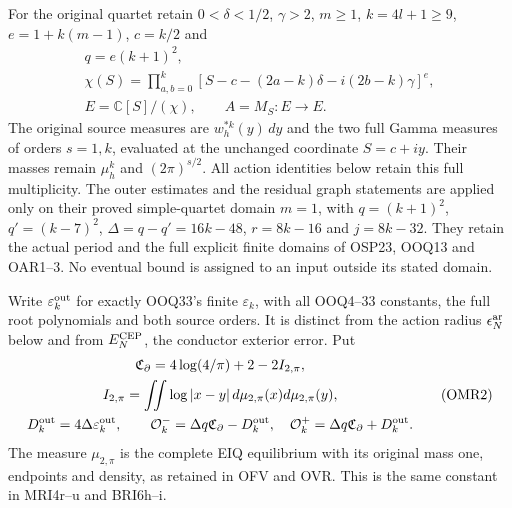 \documentclass[11pt,a4paper]{article}
\begin{document}
For the original quartet retain $0<\delta<1/2$, $\gamma>2$,
$m\ge1$, $k=4l+1\ge9$, $e=1+k(m-1)$, $c=k/2$ and
\[
 \begin{gathered}
 q=e(k+1)^2,\\
 \chi(S)=\prod_{a,b=0}^k
 [S-c-(2a-k)\delta-i(2b-k)\gamma]^e,\\
 E=\mathbb C[S]/(\chi),\qquad A=M_S:E\longrightarrow E.
 \end{gathered}\tag{OMR1}
\]
The original source measures are $w_h^{*k}(y)\,dy$ and the
two full Gamma measures of orders $s=1,k$, evaluated at the
unchanged coordinate $S=c+iy$. Their masses remain $\mu_h^k$
and $(2\pi)^{s/2}$. All action identities below retain this full
multiplicity. The outer estimates and the residual graph statements
are applied only on their proved simple-quartet domain $m=1$,
with $q=(k+1)^2$, $q'=(k-7)^2$, $\Delta=q-q'=16k-48$,
$r=8k-16$ and $j=8k-32$. They retain the actual period and the
full explicit finite domains of OSP23, OOQ13 and OAR1--3.
No eventual bound is assigned to an input outside its stated domain.

Write $\varepsilon_k^{\rm out}$ for exactly OOQ33's finite
$\varepsilon_k$, with all OOQ4--33 constants, the full root
polynomials and both source orders. It is distinct from the
action radius $\epsilon_N^{\rm ar}$ below and from
$E_N^{\rm CEP}$, the conductor exterior error. Put
\[
 \begin{gathered}
 \mathfrak C_\partial=4\log(4/\pi)+2-2I_{2,\pi},\\
 I_{2,\pi}=\iint\log|x-y|\,d\mu_{2,\pi}(x)d\mu_{2,\pi}(y),\\
 D_k^{\rm out}=4\Delta\varepsilon_k^{\rm out},\qquad
 \mathcal O_k^-=\Delta q\mathfrak C_\partial-D_k^{\rm out},\quad
 \mathcal O_k^+=\Delta q\mathfrak C_\partial+D_k^{\rm out}.
 \end{gathered}\tag{OMR2}
\]
The measure $\mu_{2,\pi}$ is the complete EIQ equilibrium with
its original mass one, endpoints and density, as retained in OFV
and OVR. This is the same constant in MRI4r--u and BRI6h--i.
\end{document}
